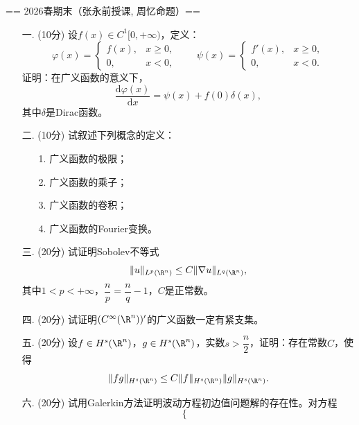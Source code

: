
== 2026春期末（张永前授课, 周忆命题）==
\begin{enumerate}
    \item[一.] (10分) 设$f(x)\in C^1[0,+\infty)$，定义：
    \begin{equation*}
        \varphi(x)=
        \begin{cases}
            f(x),&x\geqslant 0,\\
            0,&x<0,
        \end{cases}
        \qquad
        \psi(x)=
        \begin{cases}
            f'(x),&x\geqslant 0,\\
            0,&x<0.
        \end{cases}
    \end{equation*}
    证明：在广义函数的意义下，
    \[
        \frac{\mathrm{d}\varphi(x)}{\mathrm{d}x}
        =\psi(x)+f(0)\delta(x),
    \]
    其中$\delta$是Dirac函数。
    \item[二.] (10分) 试叙述下列概念的定义：
    \begin{itemize}
        \item[1.] 广义函数的极限；
        \item[2.] 广义函数的乘子；
        \item[3.] 广义函数的卷积；
        \item[4.] 广义函数的Fourier变换。
    \end{itemize}
    \item[三.] (20分) 试证明Sobolev不等式
    \[
        \|u\|_{L^p(\R^n)}\leq C\|\nabla u\|_{L^q(\R^n)},
    \]
    其中$1<p<+\infty$，$\dfrac{n}{p}=\dfrac{n}{q}-1$，$C$是正常数。
    \item[四.] (20分) 试证明$(C^\infty(\R^n))'$的广义函数一定有紧支集。
    \item[五.] (20分) 设$f\in H^s(\R^n)$，$g\in H^s(\R^n)$，实数$s>\dfrac{n}{2}$，证明：存在常数$C$，使得
    \[
        \|fg\|_{H^s(\R^n)}
        \leq C\|f\|_{H^s(\R^n)}\|g\|_{H^s(\R^n)}.
    \]
    \item[六.] (20分) 试用Galerkin方法证明波动方程初边值问题解的存在性。对方程
    \[
        \begin{cases}

\end{cases}\]
\end{enumerate}
